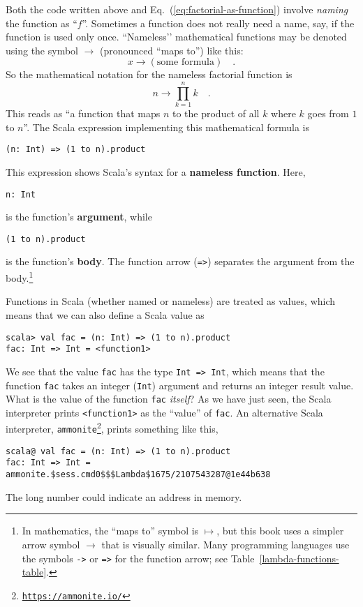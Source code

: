 Both the code written above and Eq.~(\ref{eq:factorial-as-function})
involve \emph{naming} the function as \textsf{``}$f$\textsf{''}. Sometimes a function
does not really need a name, \textemdash{} say, if the function is
used only once. \textsf{``}Nameless\textsf{'}' mathematical functions may be denoted
using the symbol $\rightarrow$ (pronounced \textsf{``}maps to\textsf{''}) like this:
\[
x\rightarrow\left(\text{some formula}\right)\quad.
\]
So the mathematical notation for the nameless factorial function is
\[
n\rightarrow\prod_{k=1}^{n}k\quad.
\]
This reads as \textsf{``}a function that maps $n$ to the product of all $k$
where $k$ goes from $1$ to $n$\textsf{''}. The Scala expression implementing
this mathematical formula is
\begin{lstlisting}
(n: Int) => (1 to n).product
\end{lstlisting}
This expression shows Scala\textsf{'}s syntax for a \textbf{nameless function}.
Here, 
\begin{lstlisting}
n: Int
\end{lstlisting}
is the function\textsf{'}s \textbf{argument}, while
\begin{lstlisting}
(1 to n).product
\end{lstlisting}
is the function\textsf{'}s \textbf{body}. The function arrow (\lstinline!=>!)
separates the argument from the body.\footnote{In mathematics, the \textsf{``}maps to\textsf{''} symbol is $\mapsto$, but this book
uses a simpler arrow symbol $\rightarrow$ that is visually similar.
Many programming languages use the symbols \lstinline!->! or \lstinline!=>!
for the function arrow; see Table~\ref{lambda-functions-table}.} 

Functions in Scala (whether named or nameless) are treated as values,
which means that we can also define a Scala value as
\begin{lstlisting}
scala> val fac = (n: Int) => (1 to n).product
fac: Int => Int = <function1>
\end{lstlisting}
We see that the value \lstinline!fac! has the type \lstinline!Int => Int!,
which means that the function \lstinline!fac! takes an integer (\lstinline!Int!)
argument and returns an integer result value. What is the value of
the function \lstinline!fac! \emph{itself}? As we have just seen,
the Scala interpreter prints \lstinline!<function1>! as the \textsf{``}value\textsf{''}
of \lstinline!fac!. An alternative Scala interpreter, \texttt{ammonite}\footnote{\texttt{\href{https://ammonite.io/}{https://ammonite.io/}}},
prints something like this,
\begin{lstlisting}
scala@ val fac = (n: Int) => (1 to n).product
fac: Int => Int = ammonite.$sess.cmd0$$$Lambda$1675/2107543287@1e44b638
\end{lstlisting}
The long number could indicate an address in memory.

